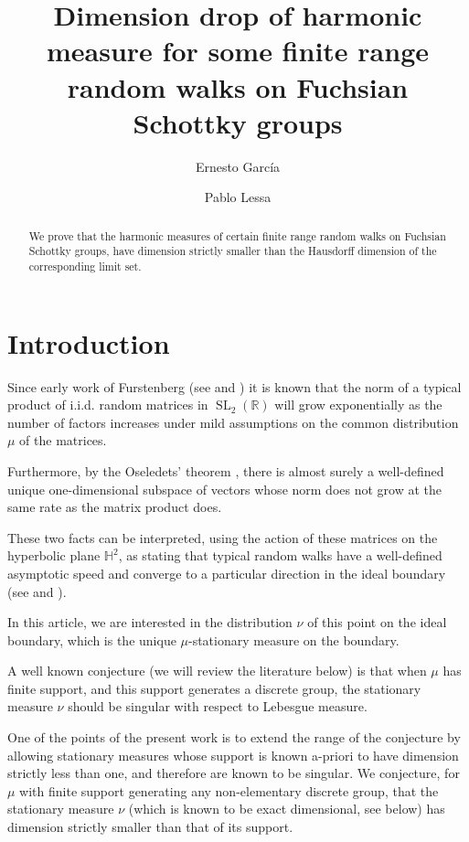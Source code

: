 \documentclass{article}
\title{Dimension drop of harmonic measure for some finite range random walks on Fuchsian Schottky groups}
\author{Ernesto García \and Pablo Lessa}
\newcommand{\R}{\mathbb{R}}
\renewcommand{\H}{\mathbb{H}}
\DeclareMathOperator{\SL}{SL}
\begin{document}
\maketitle

 

\begin{abstract}
 We prove that the harmonic measures of certain finite range random walks on Fuchsian Schottky groups, have dimension strictly smaller than the Hausdorff dimension of the corresponding limit set.
\end{abstract}

\section{Introduction}

Since early work of Furstenberg (see \cite{furstenberg} and \cite{ledrappierpositive}) it is known that the norm of a typical product of i.i.d. random matrices in \(\SL_2(\R)\) will grow exponentially as the number of factors increases under mild assumptions on the common distribution \(\mu\) of the matrices. 

Furthermore, by the Oseledets' theorem \cite{oseledets}, there is almost surely a well-defined unique one-dimensional subspace of vectors whose norm does not grow at the same rate as the matrix product does.    

These two facts can be interpreted, using the action of these matrices on the hyperbolic plane \(\H^2\), as stating that typical random walks have a well-defined asymptotic speed and converge to a particular direction in the ideal boundary (see \cite{kaimanovich} and \cite{karlsson-margulis}).

In this article, we are interested in the distribution \(\nu\) of this point on the ideal boundary, which is the unique \(\mu\)-stationary measure on the boundary.   

A well known conjecture (we will review the literature below) is that when \(\mu\) has finite support, and this support generates a discrete group, the stationary measure \(\nu\) should be singular with respect to Lebesgue measure.

One of the points of the present work is to extend the range of the conjecture by allowing stationary measures whose support is known a-priori to have dimension strictly less than one, and therefore are known to be singular.  We conjecture, for \(\mu\) with finite support generating any non-elementary discrete group, that the stationary measure \(\nu\) (which is known to be exact dimensional, see below) has dimension strictly smaller than that of its support.
\end{document}
